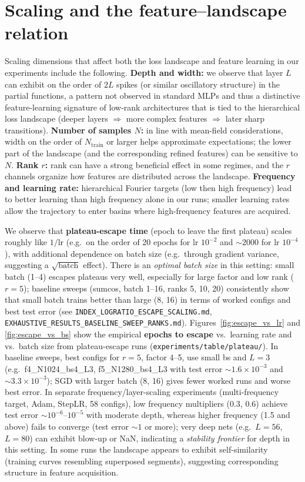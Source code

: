 \documentclass{article}
\begin{document}
\section{Scaling and the feature--landscape relation}
\label{sec:scaling}

Scaling dimensions that affect both the loss landscape and feature learning in our experiments include the following. \textbf{Depth and width:} we observe that layer $L$ can exhibit on the order of $2L$ spikes (or similar oscillatory structure) in the partial functions, a pattern not observed in standard MLPs and thus a distinctive feature-learning signature of low-rank architectures that is tied to the hierarchical loss landscape (deeper layers $\Rightarrow$ more complex features $\Rightarrow$ later sharp transitions). \textbf{Number of samples $N$:} in line with mean-field considerations, width on the order of $N_{\mathrm{train}}$ or larger helps approximate expectations; the lower part of the landscape (and the corresponding refined features) can be sensitive to $N$. \textbf{Rank $r$:} rank can have a strong beneficial effect in some regimes, and the $r$ channels organize how features are distributed across the landscape. \textbf{Frequency and learning rate:} hierarchical Fourier targets (low then high frequency) lead to better learning than high frequency alone in our runs; smaller learning rates allow the trajectory to enter basins where high-frequency features are acquired.

We observe that \textbf{plateau-escape time} (epoch to leave the first plateau) scales roughly like $1/\mathrm{lr}$ (e.g.\ on the order of 20 epochs for lr $10^{-2}$ and $\sim 2000$ for lr $10^{-4}$), with additional dependence on batch size (e.g.\ through gradient variance, suggesting a $\sqrt{\mathrm{batch}}$ effect). There is an \emph{optimal batch size} in this setting: small batch (1--4) escapes plateaus very well, especially for large factor and low rank ($r=5$); baseline sweeps (sumcos, batch 1--16, ranks 5, 10, 20) consistently show that small batch trains better than large (8, 16) in terms of worked configs and best test error (see \texttt{INDEX\_LOGRATIO\_ESCAPE\_SCALING.md}, \texttt{EXHAUSTIVE\_RESULTS\_BASELINE\_SWEEP\_RANKS.md}). Figures~\ref{fig:escape_vs_lr} and \ref{fig:escape_vs_bs} show the empirical \textbf{epochs to escape} vs.\ learning rate and vs.\ batch size from plateau-escape runs (\texttt{experiments/table/plateau/}). In baseline sweeps, best configs for $r=5$, factor 4--5, use small bs and $L=3$ (e.g.\ f4\_N1024\_bs4\_L3, f5\_N1280\_bs4\_L3 with test error $\sim 1.6{\times}10^{-3}$ and $\sim 3.3{\times}10^{-3}$); SGD with larger batch (8, 16) gives fewer worked runs and worse best error. In separate frequency/layer-scaling experiments (multi-frequency target, Adam, StepLR, 58 configs), low frequency multipliers (0.3, 0.6) achieve test error $\sim 10^{-6}$--$10^{-5}$ with moderate depth, whereas higher frequency (1.5 and above) fails to converge (test error $\sim 1$ or more); very deep nets (e.g.\ $L=56$, $L=80$) can exhibit blow-up or NaN, indicating a \emph{stability frontier} for depth in this setting. In some runs the landscape appears to exhibit self-similarity (training curves resembling superposed segments), suggesting corresponding structure in feature acquisition.
\end{document}

